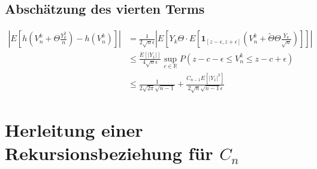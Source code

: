 \subsection{Abschätzung des vierten Terms}

\begin{align*}
	\left|E\left[h\left(V_n^k+\Theta\frac{Y_k^2}n\right)-h\left(V_n^k\right)\right]\right| &=\frac{1}{2\sqrt n \epsilon}\left|E\left[Y_k\Theta\cdot E\left[\mathbf{1}_[z-\epsilon,z+\epsilon]\left(V_n^k + \tilde \Theta\Theta\frac{Y_k}{\sqrt n}\right)\right]\right]\right| \\[1em]
& \le \frac{E[|Y_1|]}{4\sqrt n \epsilon} \sup_{c\in\mathbb R} P\left(z-c-\epsilon \le V_n^k \le z-c+\epsilon\right) \\[1em]
& \le \frac{1}{2\sqrt{2\pi}\sqrt{n-1}} + \frac{C_{n-1}E[|Y_1|^3]}{2\sqrt  n\sqrt{n-1}\epsilon}
\end{align*}

\section{Herleitung einer Rekursionsbeziehung für $C_n$}

